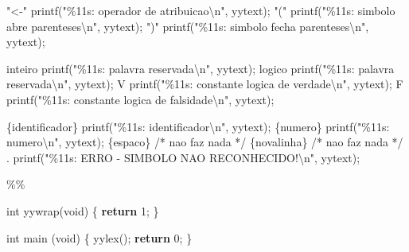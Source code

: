 \documentclass[
  brazilian,
  letterpaper,
]{book}
\newenvironment{Shaded}{\begin{snugshade}}{\end{snugshade}}
\newcommand{\CommentTok}[1]{\textcolor[rgb]{0.37,0.37,0.37}{#1}}
\newcommand{\ControlFlowTok}[1]{\textcolor[rgb]{0.00,0.23,0.31}{\textbf{#1}}}
\newcommand{\DataTypeTok}[1]{\textcolor[rgb]{0.68,0.00,0.00}{#1}}
\newcommand{\DecValTok}[1]{\textcolor[rgb]{0.68,0.00,0.00}{#1}}
\newcommand{\NormalTok}[1]{\textcolor[rgb]{0.00,0.23,0.31}{#1}}
\newcommand{\OperatorTok}[1]{\textcolor[rgb]{0.37,0.37,0.37}{#1}}
\newcommand{\SpecialCharTok}[1]{\textcolor[rgb]{0.37,0.37,0.37}{#1}}
\newcommand{\StringTok}[1]{\textcolor[rgb]{0.13,0.47,0.30}{#1}}
\theoremstyle{plain}
\theoremstyle{definition}
\theoremstyle{remark}
\begin{document}
\begin{Shaded}
\begin{Highlighting}[]
\StringTok{"\textless{}{-}"}\NormalTok{        printf}\OperatorTok{(}\StringTok{"}\SpecialCharTok{\%11s}\StringTok{: operador de atribuicao}\SpecialCharTok{\textbackslash{}n}\StringTok{"}\OperatorTok{,}\NormalTok{ yytext}\OperatorTok{);}
\StringTok{"("}\NormalTok{     printf}\OperatorTok{(}\StringTok{"}\SpecialCharTok{\%11s}\StringTok{: simbolo abre parenteses}\SpecialCharTok{\textbackslash{}n}\StringTok{"}\OperatorTok{,}\NormalTok{ yytext}\OperatorTok{);}
\StringTok{")"}\NormalTok{     printf}\OperatorTok{(}\StringTok{"}\SpecialCharTok{\%11s}\StringTok{: simbolo fecha parenteses}\SpecialCharTok{\textbackslash{}n}\StringTok{"}\OperatorTok{,}\NormalTok{ yytext}\OperatorTok{);}

\NormalTok{inteiro     printf}\OperatorTok{(}\StringTok{"}\SpecialCharTok{\%11s}\StringTok{: palavra reservada}\SpecialCharTok{\textbackslash{}n}\StringTok{"}\OperatorTok{,}\NormalTok{ yytext}\OperatorTok{);}
\NormalTok{logico      printf}\OperatorTok{(}\StringTok{"}\SpecialCharTok{\%11s}\StringTok{: palavra reservada}\SpecialCharTok{\textbackslash{}n}\StringTok{"}\OperatorTok{,}\NormalTok{ yytext}\OperatorTok{);}
\NormalTok{V       printf}\OperatorTok{(}\StringTok{"}\SpecialCharTok{\%11s}\StringTok{: constante logica de verdade}\SpecialCharTok{\textbackslash{}n}\StringTok{"}\OperatorTok{,}\NormalTok{ yytext}\OperatorTok{);}
\NormalTok{F       printf}\OperatorTok{(}\StringTok{"}\SpecialCharTok{\%11s}\StringTok{: constante logica de falsidade}\SpecialCharTok{\textbackslash{}n}\StringTok{"}\OperatorTok{,}\NormalTok{ yytext}\OperatorTok{);}

\OperatorTok{\{}\NormalTok{identificador}\OperatorTok{\}}\NormalTok{ printf}\OperatorTok{(}\StringTok{"}\SpecialCharTok{\%11s}\StringTok{: identificador}\SpecialCharTok{\textbackslash{}n}\StringTok{"}\OperatorTok{,}\NormalTok{ yytext}\OperatorTok{);}
\OperatorTok{\{}\NormalTok{numero}\OperatorTok{\}}\NormalTok{    printf}\OperatorTok{(}\StringTok{"}\SpecialCharTok{\%11s}\StringTok{: numero}\SpecialCharTok{\textbackslash{}n}\StringTok{"}\OperatorTok{,}\NormalTok{ yytext}\OperatorTok{);}
\OperatorTok{\{}\NormalTok{espaco}\OperatorTok{\}}        \CommentTok{/* nao faz nada */}
\OperatorTok{\{}\NormalTok{novalinha}\OperatorTok{\}}     \CommentTok{/* nao faz nada */}
\OperatorTok{.}\NormalTok{       printf}\OperatorTok{(}\StringTok{"}\SpecialCharTok{\%11s}\StringTok{: ERRO {-} SIMBOLO NAO RECONHECIDO!}\SpecialCharTok{\textbackslash{}n}\StringTok{"}\OperatorTok{,}\NormalTok{ yytext}\OperatorTok{);}

\OperatorTok{\%\%}

\DataTypeTok{int}\NormalTok{ yywrap}\OperatorTok{(}\DataTypeTok{void}\OperatorTok{)} \OperatorTok{\{} \ControlFlowTok{return} \DecValTok{1}\OperatorTok{;} \OperatorTok{\}}

\DataTypeTok{int}\NormalTok{ main }\OperatorTok{(}\DataTypeTok{void}\OperatorTok{)} \OperatorTok{\{}
\NormalTok{   yylex}\OperatorTok{();}
   \ControlFlowTok{return} \DecValTok{0}\OperatorTok{;}
\OperatorTok{\}}
\end{Highlighting}
\end{Shaded}
\end{document}
